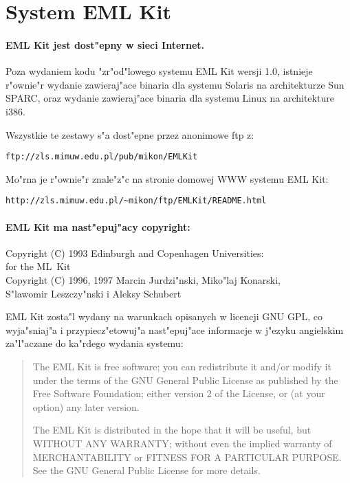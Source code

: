 
\section{System EML Kit}
\label{sec:system}

\paragraph{EML Kit jest dost"epny w sieci Internet.}
Poza wydaniem kodu "zr"o\-d"lo\-we\-go systemu EML Kit wersji 1.0,
istnieje r"ownie"r wydanie zawieraj"ace 
binaria dla systemu Solaris na architekturze Sun SPARC,
oraz wydanie zawieraj"ace binaria dla systemu Linux
na architekture i386.

Wszystkie te zestawy s"a dost"epne przez anonimowe ftp z: 
\begin{verbatim}
ftp://zls.mimuw.edu.pl/pub/mikon/EMLKit
\end{verbatim}

Mo"rna je r"ownie"r znale"z"c na stronie domowej WWW systemu EML Kit: 
\begin{verbatim}
http://zls.mimuw.edu.pl/~mikon/ftp/EMLKit/README.html
\end{verbatim}

\paragraph{EML Kit ma nast"epuj"acy copyright:}
\begin{center}
Copyright (C) 1993 Edinburgh and Copenhagen Universities:\\ for the ML~Kit\\
Copyright (C) 1996, 1997 Marcin Jurdzi"nski, Miko"laj Konarski,\\ S"lawomir Leszczy"nski i Aleksy Schubert
\end{center}

EML Kit zosta"l wydany na warunkach opisanych w licencji GNU GPL, co wyja"sniaj"a i przypiecz"etowuj"a
nas\-t"e\-pu\-j"a\-ce informacje w j"ezyku angielskim za"l"aczane do ka"rdego wydania systemu:
\begin{quotation}  
The EML Kit is free software; you can redistribute it and/or modify
it under the terms of the GNU General Public License as published by
the Free Software Foundation; either version 2 of the License, or
(at your option) any later version.

The EML Kit is distributed in the hope that it will be useful,
but WITHOUT ANY WARRANTY; without even the implied warranty of
MERCHANTABILITY or FITNESS FOR A PARTICULAR PURPOSE.  See the
GNU General Public License for more details.
\end{quotation}

